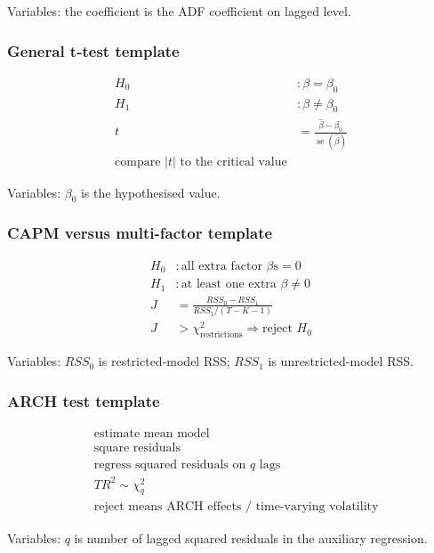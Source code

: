 \documentclass[
  8pt,
  twocolumn]{extarticle}
\begin{document}
Variables: the coefficient is the ADF coefficient on lagged level.

\subsubsection{General t-test template}\label{general-t-test-template}

\[
\begin{aligned}
H_0&:\beta=\beta_0\\
H_1&:\beta\ne\beta_0\\
t&=\frac{\hat\beta-\beta_0}{\operatorname{se}(\hat\beta)}\\
\text{compare }|t|\text{ to the critical value}
\end{aligned}
\]

Variables: \(\beta_0\) is the hypothesised value.

\subsubsection{CAPM versus multi-factor
template}\label{capm-versus-multi-factor-template}

\[
\begin{aligned}
H_0&:\text{all extra factor }\beta\text{s}=0\\
H_1&:\text{at least one extra }\beta\ne0\\
J&=\frac{RSS_0-RSS_1}{RSS_1/(T-K-1)}\\
J&>\chi^2_{\text{restrictions}}\Rightarrow\text{reject }H_0
\end{aligned}
\]

Variables: \(RSS_0\) is restricted-model RSS; \(RSS_1\) is
unrestricted-model RSS.

\subsubsection{ARCH test template}\label{arch-test-template}

\[
\begin{aligned}
&\text{estimate mean model}\\
&\text{square residuals}\\
&\text{regress squared residuals on }q\text{ lags}\\
&TR^2\sim\chi_q^2\\
&\text{reject means ARCH effects / time-varying volatility}
\end{aligned}
\]

Variables: \(q\) is number of lagged squared residuals in the auxiliary
regression.
\end{document}

